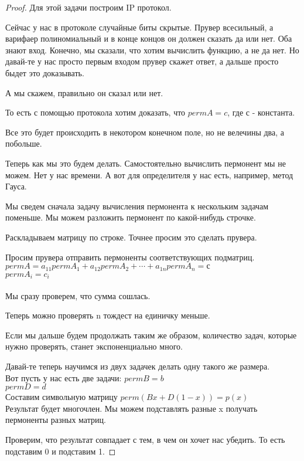 \begin{proof}
	Для этой задачи построим IP протокол. 

	Сейчас у нас в протоколе случайные биты скрытые. Прувер всесильный, а варифаер полиномиальный и
	в конце концов он должен сказать да или нет. Оба знают вход. Конечно, мы сказали, что хотим вычислить функцию,
	а не да нет. Но давай-те у нас просто первым входом прувер скажет ответ, а дальше просто быдет это доказывать.  
	
	А мы скажем, правильно он сказал или нет. 

	То есть с помощью протокола хотим доказать, что $perm A = c$, где с - константа. 

	Все это будет происходить в некотором конечном поле, но не велечины два, а побольше. 

	Теперь как мы это будем делать. Самостоятельно вычислить пермонент мы не можем. 
	Нет у нас времени. А вот для определителя у нас есть, например, метод Гауса. 

	Мы сведем сначала задачу вычисления пермонента к нескольким задачам поменьше. 
	Мы можем разложить пермонент по какой-нибудь строчке. 

	Раскладываем матрицу по строке. Точнее просим это сделать прувера. 

	Просим прувера отправить пермоненты соответствующих подматриц.\\ 
	$perm A = a_{11} perm A_1 + a_{12}perm A_2 + \cdots + a_{1n}perm A_n = с$ \\
	$perm A_{i} = c_i$\\
	\\
	Мы сразу проверем, что сумма сошлась. 

	Теперь можно проверять n тождест на единичку меньше.

	Если мы дальше будем продолжать таким же образом, количество задач, которые нужно проверять, станет экспоненциально много. 

	Давай-те теперь научимся из двух задачек делать одну такого же размера. 
	\\
	Вот пусть у нас есть две задачи:
	$perm B = b$\\
	$perm D = d$\\

	Составим символьную матрицу $perm(Bx + D(1 - x)) = p(x)$ \\
	Результат будет многочлен. Мы можем подставлять разные x получать пермоненты разных матриц. 

	Проверим, что результат совпадает с тем, в чем он хочет нас убедить. То есть подставим 0 и подставим 1. 


\end{proof}
